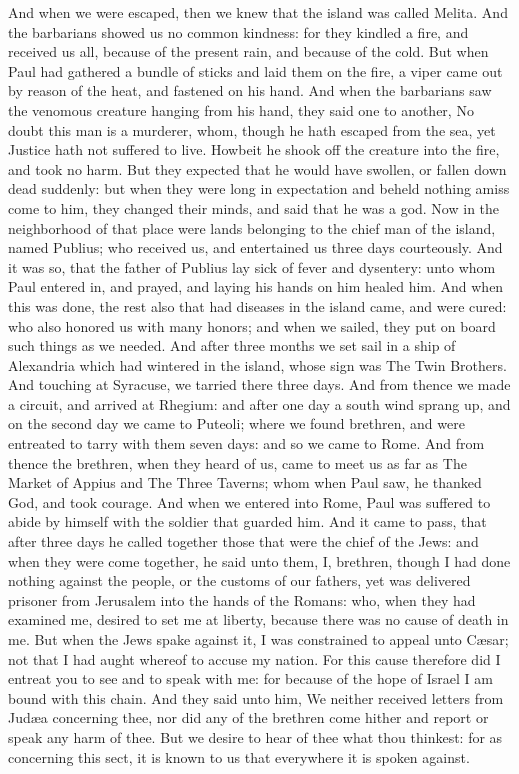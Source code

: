 And when we were escaped, then we knew that the island was called Melita. And the barbarians showed us no common kindness: for they kindled a fire, and received us all, because of the present rain, and because of the cold. But when Paul had gathered a bundle of sticks and laid them on the fire, a viper came out by reason of the heat, and fastened on his hand. And when the barbarians saw the venomous creature hanging from his hand, they said one to another, No doubt this man is a murderer, whom, though he hath escaped from the sea, yet Justice hath not suffered to live. Howbeit he shook off the creature into the fire, and took no harm. But they expected that he would have swollen, or fallen down dead suddenly: but when they were long in expectation and beheld nothing amiss come to him, they changed their minds, and said that he was a god.  Now in the neighborhood of that place were lands belonging to the chief man of the island, named Publius; who received us, and entertained us three days courteously. And it was so, that the father of Publius lay sick of fever and dysentery: unto whom Paul entered in, and prayed, and laying his hands on him healed him. And when this was done, the rest also that had diseases in the island came, and were cured: who also honored us with many honors; and when we sailed, they put on board such things as we needed.  And after three months we set sail in a ship of Alexandria which had wintered in the island, whose sign was The Twin Brothers. And touching at Syracuse, we tarried there three days. And from thence we made a circuit, and arrived at Rhegium: and after one day a south wind sprang up, and on the second day we came to Puteoli; where we found brethren, and were entreated to tarry with them seven days: and so we came to Rome. And from thence the brethren, when they heard of us, came to meet us as far as The Market of Appius and The Three Taverns; whom when Paul saw, he thanked God, and took courage.  And when we entered into Rome, Paul was suffered to abide by himself with the soldier that guarded him.  And it came to pass, that after three days he called together those that were the chief of the Jews: and when they were come together, he said unto them, I, brethren, though I had done nothing against the people, or the customs of our fathers, yet was delivered prisoner from Jerusalem into the hands of the Romans: who, when they had examined me, desired to set me at liberty, because there was no cause of death in me. But when the Jews spake against it, I was constrained to appeal unto Cæsar; not that I had aught whereof to accuse my nation. For this cause therefore did I entreat you to see and to speak with me: for because of the hope of Israel I am bound with this chain. And they said unto him, We neither received letters from Judæa concerning thee, nor did any of the brethren come hither and report or speak any harm of thee. But we desire to hear of thee what thou thinkest: for as concerning this sect, it is known to us that everywhere it is spoken against. 